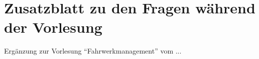 \chapter{Zusatzblatt zu den Fragen w\"{a}hrend der Vorlesung}
Erg\"{a}nzung zur Vorlesung "`Fahrwerkmanagement"' vom ...
%
